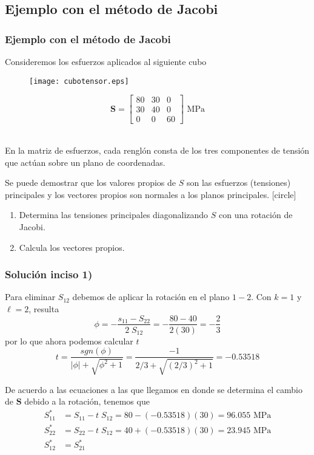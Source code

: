 \subsection{Ejemplo con el método de Jacobi}
\begin{frame}
\frametitle{Ejemplo con el método de Jacobi}
\fontsize{12}{12}\selectfont
Consideremos los esfuerzos aplicados al siguiente cubo
\\
\begin{minipage}{5cm}
\begin{figure}
	\centering
	\texttt{[image: cubotensor.eps]}
\end{figure} \hspace{0.5cm}
\end{minipage}
\begin{minipage}{5cm}
\[ \mathbf{S} = \begin{bmatrix}
80 & 30 & 0 \\
30 & 40 & 0 \\
0 & 0 & 60
\end{bmatrix} \mbox{ MPa} \]
\end{minipage}
\\
\medskip
En la matriz de esfuerzos, cada renglón consta de los tres componentes de tensión que actúan sobre un plano de coordenadas.
\end{frame}
\begin{frame}
Se puede demostrar que los valores propios de $S$ son las esfuerzos (tensiones) principales y los vectores propios son normales a los planos principales.
\pause
{}
[circle]
\begin{enumerate}[<+->]
\item Determina las tensiones principales diagonalizando $S$ con una rotación de Jacobi.
\item Calcula los vectores propios.
\end{enumerate}
\end{frame}
\begin{frame}
\frametitle{Solución inciso 1)}
Para eliminar $S_{12}$ debemos de aplicar la rotación en el plano $1-2$. Con $k = 1$ y $\ell = 2$, resulta
\[ \phi = - \dfrac{s_{11} - S_{22}}{2 \; S_{12}}  = - \dfrac{80 - 40}{2(30)} = - \dfrac{2}{3}\]
\pause
por lo que ahora podemos calcular $t$
\[ t = \dfrac{sgn(\phi)}{\vert \phi \vert + \sqrt{ \phi^{2} + 1}} = \dfrac{-1}{2/3 + \sqrt{(2/3)^{2} + 1}}  = -0.53518\]
\end{frame}
\begin{frame}
De acuerdo a las ecuaciones a las que llegamos en donde se determina el cambio de $\mathbf{S}$ debido a la rotación, tenemos que
\fontsize{12}{12}\selectfont
\begin{align*}
S_{11}^{*} &= S_{11} - t \; S_{12} = 80 - (-0.53518)(30) = 96.055 \mbox{ MPa} \\
S_{22}^{*} &= S_{22} - t \; S_{12} = 40 + (-0.53518)(30) = 23.945 \mbox{ MPa} \\
S_{12}^{*} &= S_{21}^{*}
\end{align*}
\end{frame}
